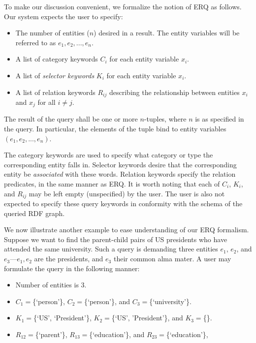 \documentclass[a4paper, twoside, 12pt]{report}
\begin{document}
To make our discussion convenient, we formalize the notion of ERQ as follows. Our system expects the user to specify:

\begin{itemize}
\item The number of entities ($n$) desired in a result. The entity variables will be referred to as $e_1, e_2, ..., e_n$.
\item A list of category keywords $C_i$ for each entity variable $x_i$.
\item A list of \emph{selector keywords} $K_i$ for each entity variable $x_i$.
\item A list of relation keywords $R_{ij}$ describing the relationship between entities $x_i$ and $x_j$ for all $i \neq j$.
\end{itemize}

The result of the query shall be one or more $n$-tuples, where $n$ is as specified in the query. In particular, the elements of the tuple bind to entity variables $(e_1, e_2, ..., e_n)$.

The category keywords are used to specify what category or type the corresponding entity falls in. Selector keywords desire that the corresponding entity be \emph{associated} with these words. Relation keywords specify the relation predicates, in the same manner as ERQ. It is worth noting that each of $C_i$, $K_i$, and $R_{ij}$ may be left empty (unspecified) by the user. The user is also not expected to specify these query keywords in conformity with the schema of the queried RDF graph.

We now illustrate another example to ease understanding of our ERQ formalism. Suppose we want to find the parent-child pairs of US presidents who have attended the same university. Such a query is demanding three entities $e_1$, $e_2$, and $e_3$---$e_1, e_2$ are the presidents, and $e_3$ their common alma mater. A user may formulate the query in the following manner:

\begin{itemize}
\item Number of entities is 3.
\item $C_1=$\{`person'\}, $C_2=$\{`person'\}, and $C_3=$\{`university'\}.
\item $K_1=$\{`US', `President'\}, $K_2=$\{`US', 'President'\}, and $K_3=$\{\}.
\item $R_{12}=$\{`parent'\}, $R_{13}=$\{`education'\}, and $R_{23}=$\{`education'\}, 
\end{itemize}
\end{document}
